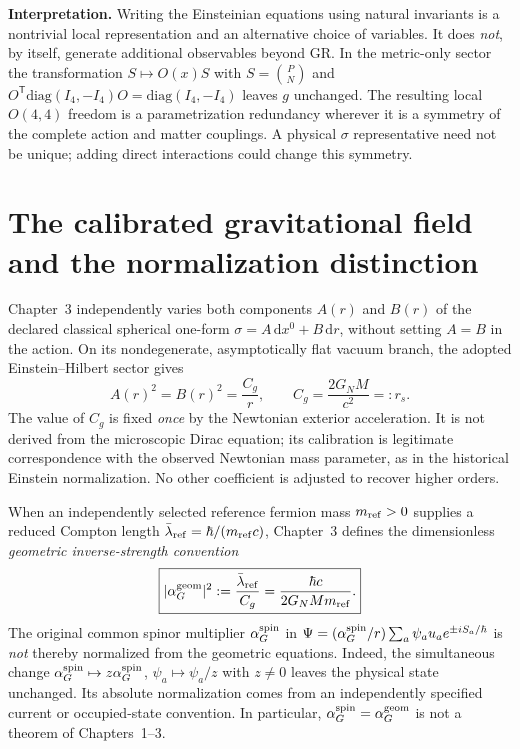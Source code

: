 \documentclass[11pt,a4paper]{article}
\newcommand{\dd}{\mathrm d}
\begin{document}
\noindent\textbf{Interpretation.}
Writing the Einsteinian equations using natural invariants is a
nontrivial local representation and an alternative choice of variables.
It does \emph{not}, by itself, generate additional observables beyond
GR. In the metric-only sector the transformation
$S\mapsto O(x)S$ with $S=\binom{P}{N}$ and
$O^{\mathsf T}\mathrm{diag}(I_4,-I_4)O=\mathrm{diag}(I_4,-I_4)$
leaves $g$ unchanged. The resulting local $O(4,4)$ freedom is a
parametrization redundancy wherever it is a symmetry of the complete
action and matter couplings. A physical $\sigma$ representative need
not be unique; adding direct interactions could change this symmetry.

\section{The calibrated gravitational field and the normalization distinction}
\label{sec:connection}
Chapter~3 independently varies both components $A(r)$ and $B(r)$ of
the declared classical spherical one-form $\sigma=A\,\dd x^0+B\,\dd r$,
without setting $A=B$ in the action. On its nondegenerate, asymptotically
flat vacuum branch, the adopted Einstein--Hilbert sector gives
\begin{equation}\label{eq:classical}
\boxed{\displaystyle A(r)^2=B(r)^2=\frac{C_g}{r},\qquad
 C_g=\frac{2G_NM}{c^2}=:r_s.}
\end{equation}
The value of $C_g$ is fixed \emph{once} by the Newtonian exterior
acceleration. It is not derived from the microscopic Dirac equation;
its calibration is legitimate correspondence with the observed
Newtonian mass parameter, as in the historical Einstein normalization.
No other coefficient is adjusted to recover higher orders.

When an independently selected reference fermion mass $m_{\rm ref}>0$
supplies a reduced Compton length $\bar\lambda_{\rm ref}=\hbar/(m_{\rm ref}c)$,
Chapter~3 defines the dimensionless \emph{geometric inverse-strength
convention}
\begin{equation}\label{eq:alphageom}
\boxed{\displaystyle |\alpha_G^{\rm geom}|^2:=\frac{\bar\lambda_{\rm ref}}{C_g}
=\frac{\hbar c}{2G_NMm_{\rm ref}}.}
\end{equation}
The original common spinor multiplier $\alpha_G^{\rm spin}$ in
$\Psi=(\alpha_G^{\rm spin}/r)\sum_a\psi_a u_a e^{\pm iS_a/\hbar}$
is \emph{not} thereby normalized from the geometric equations.
Indeed, the simultaneous change
$\alpha_G^{\rm spin}\mapsto z\alpha_G^{\rm spin}$,
$\psi_a\mapsto\psi_a/z$ with $z\ne0$ leaves the physical state
unchanged. Its absolute normalization comes from an independently
specified current or occupied-state convention. In particular,
$\alpha_G^{\rm spin}=\alpha_G^{\rm geom}$ is not a theorem of
Chapters~1--3.
\end{document}
